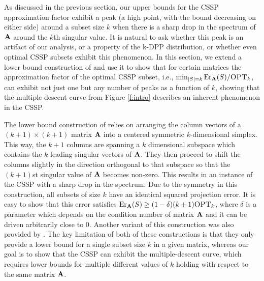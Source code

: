 \documentclass{article}
\begin{document}
 As discussed in the previous section, our upper bounds for the CSSP
 approximation factor exhibit a peak (a high point,
 with the bound decreasing on either side) around a
 subset size $k$ when there is a sharp drop in the spectrum of $\mathbf A$
 around the $k$th singular value. It is natural to ask whether this
 peak is an artifact of our analysis, or a property of the k-DPP
 distribution, or whether even optimal CSSP subsets exhibit this 
 phenomenon. In this section, we extend a lower
 bound construction of \citet{pca-volume-sampling} and use it to show
 that for certain matrices the approximation factor of the optimal CSSP subset, i.e.,
 $\min_{|S|=k}\mathrm{Er}_\mathbf A(S)/{\textsc{OPT}_k}$, can exhibit not just one but any
 number of peaks as a function of $k$, showing that the
 multiple-descent curve from Figure \ref{f:intro} describes an
inherent phenomenon in the CSSP.

The lower bound construction of \citet{pca-volume-sampling} relies on
arranging the column vectors of a $(k+1)\times (k+1)$ matrix $\mathbf A$ into a
centered symmetric $k$-dimensional simplex. This way, the $k+1$
columns are spanning a $k$ dimensional subspace which contains the $k$
leading singular vectors of $\mathbf A$. They then proceed to shift the
columns slightly in the direction orthogonal to that subspace so that
the $(k+1)$st singular value of $\mathbf A$ becomes non-zero. This results in
an instance of the CSSP with a sharp drop in the spectrum. Due
to the symmetry in this construction, all subsets of size $k$ have an identical squared
projection error. It is easy to show that this error satisfies $\mathrm{Er}_\mathbf A(S)\geq (1-\delta)(k+1){\textsc{OPT}_k}$,
where $\delta$ is a parameter which depends on the condition number of
matrix $\mathbf A$ and it can be driven arbitrarily close to $0$. Another
variant of this construction was also provided 
by \citet{more-efficient-volume-sampling}. The key limitation of both
of these constructions is that they only provide a lower bound for a
single subset size $k$ in a given matrix, whereas our goal is to show
that the CSSP can exhibit the multiple-descent curve, which requires
lower bounds for multiple different values of $k$ holding with respect
to the same matrix $\mathbf A$.
\end{document}
